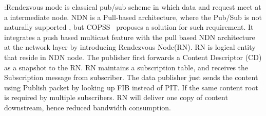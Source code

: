 \vspace{1mm}:Rendezvous mode is classical pub/sub scheme in which data and request meet at a intermediate node. NDN is a Pull-based architecture, where the Pub/Sub is not naturally supported , but COPSS~\cite{**copss paper**} proposes a solution for such requirement. It integrates a push based multicast feature with the pull based NDN architecture at the network layer by introducing Rendezvous Node(RN). RN is logical entity that reside in NDN node. The publisher first forwards a Content Descriptor (CD) as a snapshot to the RN. RN maintains a subscription table, and receives the Subscription message from subscriber. The data publisher just sends the content using Publish packet by looking up FIB instead of PIT. If the same content root is required by multiple subscribers. RN will deliver one copy  of content downstream, hence reduced bandwidth consumption.

